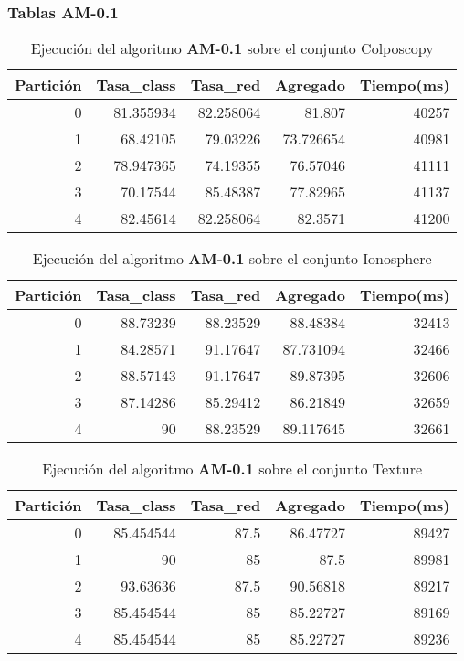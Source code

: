 \documentclass[size=a4, parskip=half, titlepage=false, toc=flat, toc=bib, 12pt]{scrartcl}
\begin{document}
\newpage

\subsubsection{Tablas AM-0.1}

 \begin{table}[ht]
  \centering
  \begin{tabular}[t]{rrrrr}
  \toprule
  Partición &Tasa\_class &Tasa\_red & Agregado & Tiempo(ms)\\
  \midrule
0         & 81.355934 & 82.258064 & 81.807    & 40257  \\
1         & 68.42105  & 79.03226  & 73.726654 & 40981  \\
2         & 78.947365 & 74.19355  & 76.57046  & 41111  \\
3         & 70.17544  & 85.48387  & 77.82965  & 41137  \\
4         & 82.45614  & 82.258064 & 82.3571   & 41200  \\
  \bottomrule
  \end{tabular}
  \caption{Ejecución del algoritmo \textbf{AM-0.1} sobre el conjunto Colposcopy }
  \end{table}%

 \begin{table}[ht]
  \centering
  \begin{tabular}[t]{rrrrr}
  \toprule
  Partición &Tasa\_class &Tasa\_red & Agregado & Tiempo(ms)\\
  \midrule
0         & 88.73239  & 88.23529 & 88.48384  & 32413  \\
1         & 84.28571  & 91.17647 & 87.731094 & 32466  \\
2         & 88.57143  & 91.17647 & 89.87395  & 32606  \\
3         & 87.14286  & 85.29412 & 86.21849  & 32659  \\
4         & 90        & 88.23529 & 89.117645 & 32661  \\
  \bottomrule
  \end{tabular}
  \caption{Ejecución del algoritmo \textbf{AM-0.1} sobre el conjunto Ionosphere}
  \end{table}%

 \begin{table}[ht]
  \centering
  \begin{tabular}[t]{rrrrr}
  \toprule
  Partición &Tasa\_class &Tasa\_red & Agregado & Tiempo(ms)\\
  \midrule
0         & 85.454544 & 87.5     & 86.47727 & 89427  \\
1         & 90        & 85       & 87.5     & 89981  \\
2         & 93.63636  & 87.5     & 90.56818 & 89217  \\
3         & 85.454544 & 85       & 85.22727 & 89169  \\
4         & 85.454544 & 85       & 85.22727 & 89236  \\
\bottomrule
  \end{tabular}
  \caption{Ejecución del algoritmo \textbf{AM-0.1} sobre el conjunto Texture}
  \end{table}%
\end{document}
